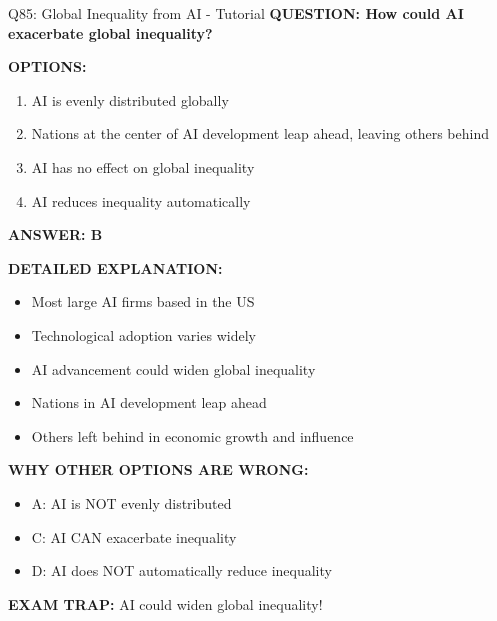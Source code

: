 \documentclass[8pt]{beamer}
\begin{document}
	\begin{frame}{Q85: Global Inequality from AI - Tutorial}
		\fontsize{6.5}{7.5}\selectfont
		\textbf{QUESTION: How could AI exacerbate global inequality?}
		
		\vspace{0.1cm}
		\textbf{OPTIONS:}
		\begin{enumerate}
			\item AI is evenly distributed globally
			\item Nations at the center of AI development leap ahead, leaving others behind
			\item AI has no effect on global inequality
			\item AI reduces inequality automatically
		\end{enumerate}
		
		\vspace{0.1cm}
		\textcolor{myblue}{\textbf{ANSWER: B}}
		
		\vspace{0.1cm}
		\textbf{DETAILED EXPLANATION:}
		\begin{itemize}
			\item Most large AI firms based in the US
			\item Technological adoption varies widely
			\item AI advancement could widen global inequality
			\item Nations in AI development leap ahead
			\item Others left behind in economic growth and influence
		\end{itemize}
		
		\vspace{0.1cm}
		\textcolor{myred}{\textbf{WHY OTHER OPTIONS ARE WRONG:}}
		\begin{itemize}
			\item \textcolor{myred}{A:} AI is NOT evenly distributed
			\item \textcolor{myred}{C:} AI CAN exacerbate inequality
			\item \textcolor{myred}{D:} AI does NOT automatically reduce inequality
		\end{itemize}
		
		\textcolor{myred}{\textbf{EXAM TRAP:}} AI could \textcolor{myblue}{widen global inequality}!
	\end{frame}
	
	
\end{document}
